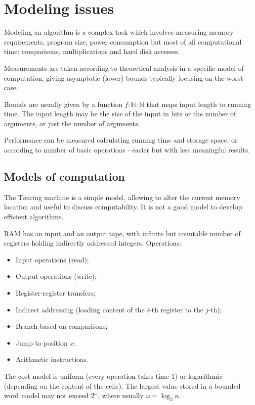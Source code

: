 \section{Modeling issues}
Modeling an algorithm is a complex task which involves measuring memory requirements, program size, power consumption but most of all computational time: comparisons, multiplications and hard disk accesses.

Measurements are taken according to theoretical analysis in a specific model of computation, giving asymptotic (lower) bounds typically focusing on the worst case. 

Bounds are usually given by a function $f : \mathbb{N} : \mathbb{N}$ that maps input length to running time. The input length may be the size of the input in bits or the number of arguments, or just the number of arguments.

Performance can be measured calculating running time and storage space, or according to number of basic operations - easier but with less meaningful results.

\subsection{Models of computation}
The Touring machine is a simple model, allowing to alter the current memory location and useful to discuss computability. It is not a good model to develop efficient algorithms.

RAM has an input and an output tape, with infinite but countable number of registers holding indirectly addressed integers. Operations:
\begin{itemize}
	\item Input operations (read);
	\item Output operations (write);
	\item Register-register transfers;
	\item Indirect addressing (loading content of the $i$-th register to the $j$-th);
	\item Branch based on comparisons;
	\item Jump to position $x$;
	\item Arithmetic instructions.
\end{itemize}
The cost model is uniform (every operation takes time 1) or logarithmic (depending on the content of the cells). The largest value stored in a bounded word model may not exceed $2^\omega$, where usually $\omega = \log_2 n$.

